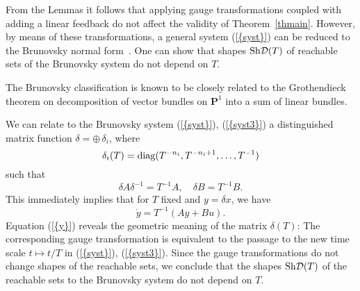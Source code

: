 \documentclass[final]{siamltex}
\begin{document}
\iffalse Lemma~\ref{gauge} is obvious. We postpone proving the Lemma
\ref{linear_feedback} for a moment, and \fi

From the Lemmas it follows that applying gauge transformations coupled with
adding a linear feedback do not affect the validity of Theorem~\ref{thmain}.
However, by means of these transformations, a general system {(\ref{{syst}})} can
be reduced to the Brunovsky normal form~\cite{Brun}. \iffalse, where the
matrices $A$ and $B$ are the direct sums $A=\oplus A_i$, $B=\oplus B_i$, and
the matrices $A_i$ and $B_i$ of sizes $n_i\times n_i$ and $n_i\times 1$,
respectively, take the form
\begin{equation*}\label{syst3}
A_i=\left(\begin{array}{cccc}
  0 & 1 &  &  \\
   & 0 & \ddots &  \\
   &  & \ddots & 1 \\
   &  &  & 0 \\
\end{array}\right), \quad
B_i=\left(\begin{array}{c}
  0 \\
  0 \\
  \vdots \\
  1 \\
\end{array}\right).
\end{equation*}
\fi One can show that shapes ${\mathop{\rm Sh}\nolimits}{\cal D} (T)$ of reachable sets of the
Brunovsky system do not depend on $T$.

The Brunovsky classification is known to be closely related to the Grothendieck
theorem \cite{Groth} on decomposition of vector bundles on ${\mathbf P}^1$ into
a sum  of linear bundles.

\iffalse

We can relate to the Brunovsky system {(\ref{{syst}})}, {(\ref{{syst3}})} a distinguished   matrix function
$\delta=\oplus \,\delta_i$, where
\begin{equation}\label{delta}\delta_i(T)={\mathop{\rm diag}\nolimits}(T^{-n_i},T^{-n_i+1},\dots,T^{-1})\end{equation}
such that
\begin{equation}\label{prop}
\delta A\delta^{-1}=T^{-1}A,\quad \delta B=T^{-1}B.
\end{equation}
This immediately implies that for $T$ fixed and  $y=\delta x$, we have
\begin{equation}\label{y}
\dot y=T^{-1}\left(Ay+Bu\right).
\end{equation}
Equation {(\ref{{y}})} reveals the geometric meaning of the matrix $\delta(T)$: The
corresponding gauge transformation is equivalent to the passage to the new time
scale  $t\mapsto t/T$ in  {(\ref{{syst}})}, {(\ref{{syst3}})}. Since the gauge
transformations do not change shapes of the reachable sets,
we conclude that the shapes ${\mathop{\rm Sh}\nolimits}{\cal D} (T)$ of the reachable sets to the
Brunovsky system do not depend on $T$.
\end{document}
